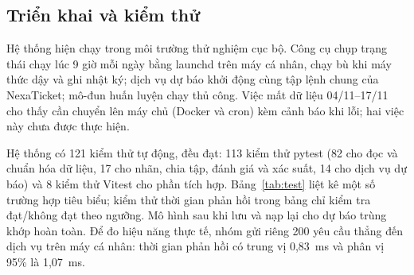 \documentclass{IEEEtran}
\begin{document}
\subsection{Triển khai và kiểm thử}
Hệ thống hiện chạy trong môi trường thử nghiệm cục bộ. Công cụ chụp trạng thái chạy lúc 9 giờ mỗi ngày bằng launchd trên máy cá nhân, chạy bù khi máy thức dậy và ghi nhật ký; dịch vụ dự báo khởi động cùng tập lệnh chung của NexaTicket; mô-đun huấn luyện chạy thủ công. Việc mất dữ liệu 04/11--17/11 cho thấy cần chuyển lên máy chủ (Docker và cron) kèm cảnh báo khi lỗi; hai việc này chưa được thực hiện.

\begin{table}[!t]
\caption{Một số trường hợp kiểm thử tiêu biểu (tất cả đều đạt)}
\label{tab:test}
\centering
\small
\setlength{\tabcolsep}{3pt}
\end{table}

Hệ thống có 121 kiểm thử tự động, đều đạt: 113 kiểm thử pytest (82 cho đọc và chuẩn hóa dữ liệu, 17 cho nhãn, chia tập, đánh giá và xác suất, 14 cho dịch vụ dự báo) và 8 kiểm thử Vitest cho phần tích hợp. Bảng~\ref{tab:test} liệt kê một số trường hợp tiêu biểu; kiểm thử thời gian phản hồi trong bảng chỉ kiểm tra đạt/không đạt theo ngưỡng. Mô hình sau khi lưu và nạp lại cho dự báo trùng khớp hoàn toàn. Để đo hiệu năng thực tế, nhóm gửi riêng 200 yêu cầu thẳng đến dịch vụ trên máy cá nhân: thời gian phản hồi có trung vị 0,83~ms và phân vị 95\% là 1,07~ms.
\end{document}
